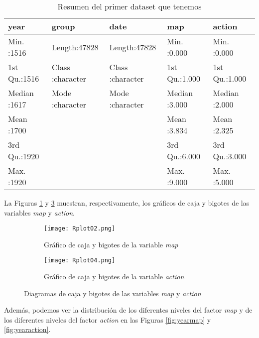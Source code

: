 \documentclass[10pt,a4paper]{article}
\begin{document}
\begin{table}[ht]
\centering
\begin{tabular}{lllll}
  \hline
     year &    group &     date &      map &     action \\ 
  \hline
Min.   :1516   & Length:47828       & Length:47828       & Min.   :0.000   & Min.   :0.000   \\ 
  1st Qu.:1516   & Class :character   & Class :character   & 1st Qu.:1.000   & 1st Qu.:1.000   \\ 
  Median :1617   & Mode  :character   & Mode  :character   & Median :3.000   & Median :2.000   \\ 
  Mean   :1700   &  &  & Mean   :3.834   & Mean   :2.325   \\ 
  3rd Qu.:1920   &  &  & 3rd Qu.:6.000   & 3rd Qu.:3.000   \\ 
  Max.   :1920   &  &  & Max.   :9.000   & Max.   :5.000   \\ 
   \hline
\end{tabular}
\caption{Resumen del primer dataset que tenemos}
\label{table:2}
\end{table}

La Figuras \ref{fig:boxplotmap} y \ref{fig:boxplotaction} muestran, respectivamente, los gráficos de caja y bigotes de las variables \emph{map} y \emph{action}.

\begin{figure}[!tbp]
  \begin{subfigure}[b]{0.49\textwidth}
    \texttt{[image: Rplot02.png]}
    \caption{Gráfico de caja y bigotes de la variable \emph{map}}
    \label{fig:boxplotmap}
  \end{subfigure}
  \hfill
  \begin{subfigure}[b]{0.49\textwidth}
    \texttt{[image: Rplot04.png]}
    \caption{Gráfico de caja y bigotes de la variable \emph{action}}
    \label{fig:boxplotaction}
  \end{subfigure}
  \caption{Diagramas de caja y bigotes de las variables \emph{map} y \emph{action}}
\end{figure}

Además, podemos ver la distribución de los diferentes niveles del factor \emph{map} y de los diferentes niveles del factor \emph{action} en las Figuras \ref{fig:yearmap} y \ref{fig:yearaction}.
\end{document}
